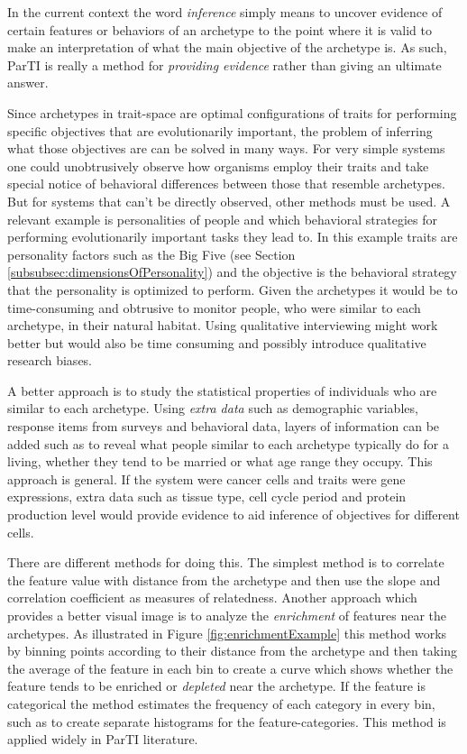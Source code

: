 In the current context the word \textit{inference} simply means to uncover evidence of certain features or behaviors of an archetype to the point where it is valid to make an interpretation of what the main objective of the archetype is. As such, ParTI is really a method for \textit{providing evidence} rather than giving an ultimate answer.

Since archetypes in trait-space are optimal configurations of traits for performing specific objectives that are evolutionarily important, the problem of inferring what those objectives are can be solved in many ways. For very simple systems one could unobtrusively observe how organisms employ their traits and take special notice of behavioral differences between those that resemble archetypes. But for systems that can't be directly observed, other methods must be used. A relevant example is personalities of people and which behavioral strategies for performing evolutionarily important tasks they lead to. In this example traits are personality factors such as the Big Five (see Section \ref{subsubsec:dimensionsOfPersonality}) and the objective is the behavioral strategy that the personality is optimized to perform. Given the archetypes it would be to time-consuming and obtrusive to monitor people, who were similar to each archetype, in their natural habitat. Using qualitative interviewing might work better but would also be time consuming and possibly introduce qualitative research biases.

A better approach is to study the statistical properties of individuals who are similar to each archetype. Using \textit{extra data} such as demographic variables, response items from surveys and behavioral data, layers of information can be added such as to reveal what people similar to each archetype typically do for a living, whether they tend to be married or what age range they occupy. This approach is general. If the system were cancer cells and traits were gene expressions, extra data such as tissue type, cell cycle period and protein production level would provide evidence to aid inference of objectives for different cells.

There are different methods for doing this. The simplest method is to correlate the feature value with distance from the archetype and then use the slope and correlation coefficient as measures of relatedness.
Another approach which provides a better visual image is to analyze the \textit{enrichment} of features near the archetypes. As illustrated in Figure \ref{fig:enrichmentExample} this method works by binning points according to their distance from the archetype and then taking the average of the feature in each bin to create a curve which shows whether the feature tends to be enriched or \textit{depleted} near the archetype. If the feature is categorical the method estimates the frequency of each category in every bin, such as to create separate histograms for the feature-categories. This method is applied widely in ParTI literature.

